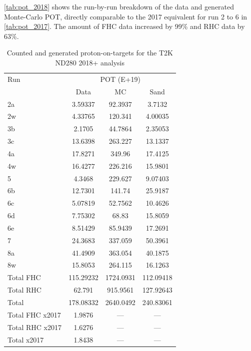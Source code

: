 \autoref{tab:pot_2018} shows the run-by-run breakdown of the data and generated Monte-Carlo POT, directly comparable to the 2017 equivalent for run 2 to 6 in \autoref{tab:pot_2017}. The amount of FHC data increased by 99\% and RHC data by 63\%.
\begin{table}[h]
	\centering
	\begin{tabular}{ l c c c }
		\hline
		\hline
		Run &  \multicolumn{3}{c}{POT (E+19)} \\
		    & 	Data & MC & Sand \\
		\hline
		2a  & 3.59337    & 92.3937     & 3.7132  \\
		2w  & 4.33765    & 120.341     & 4.00035 \\
		\hline
		3b  & 2.1705     & 44.7864     & 2.35053 \\
		3c  & 13.6398    & 263.227     & 13.1337 \\
		\hline
		4a  & 17.8271    & 349.96      & 17.4125 \\
		4w  & 16.4277    & 226.216     & 15.9801 \\
		\hline
		5   & 4.3468     & 229.627     & 9.07403 \\
		\hline
		6b  & 12.7301    & 141.74      & 25.9187 \\
		6c  & 5.07819    & 52.7562     & 10.4626 \\
		6d  & 7.75302    & 68.83       & 15.8059 \\
		6e  & 8.51429    & 85.9439     & 17.2691 \\
		\hline
		7   & 24.3683	 & 337.059     & 50.3961 \\
		\hline
		8a  & 41.4909	 & 363.054	   & 40.1875 \\
		8w  & 15.8053    & 264.115 	   & 16.1263 \\
		\hline
		Total FHC & 115.29232 & 1724.0931 &  112.09418 \\
		Total RHC & 62.791 	  & 915.9561  &  127.92643 \\
		\hline
		\hline
		Total 	  & 178.08332 & 2640.0492 &  240.83061 \\
		\hline
		\hline
		Total FHC x2017 & 1.9876 & --- & --- \\
		Total RHC x2017 & 1.6276 & --- & --- \\
		Total x2017 	& 1.8438 & --- & --- \\
		\hline
		\hline
	\end{tabular}
	\caption{Counted and generated proton-on-targets for the T2K ND280 2018+ analysis}
	\label{tab:pot_2018}
\end{table}

